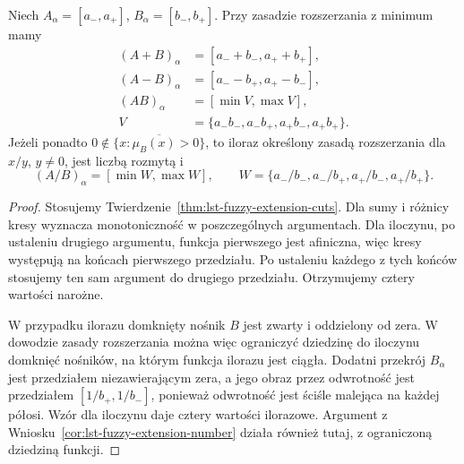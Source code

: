 \begin{stwierdzenie}\label{prop:lst-fuzzy-interval-arithmetic}
Niech $A_\alpha=[a_-,a_+]$, $B_\alpha=[b_-,b_+]$.
Przy zasadzie rozszerzania z minimum mamy
\[
\begin{split}
 (A+B)_\alpha&=[a_-+b_-,a_++b_+],\\
 (A-B)_\alpha&=[a_--b_+,a_+-b_-],\\
 (AB)_\alpha&=[\min V,\max V],\\
 V&=\{a_-b_-,a_-b_+,a_+b_-,a_+b_+\}.
\end{split}
\]
Jeżeli ponadto $0\notin\overline{\{x:\mu_B(x)>0\}}$,
to iloraz określony zasadą rozszerzania dla $x/y$,
$y\ne0$, jest liczbą rozmytą i
\[
 (A/B)_\alpha=[\min W,\max W],\qquad
 W=\{a_-/b_-,a_-/b_+,a_+/b_-,a_+/b_+\}.
\]
\end{stwierdzenie}
\begin{proof}
Stosujemy Twierdzenie~\ref{thm:lst-fuzzy-extension-cuts}.
Dla sumy i różnicy kresy wyznacza monotoniczność
w poszczególnych argumentach. Dla iloczynu, po ustaleniu
drugiego argumentu, funkcja pierwszego jest afiniczna,
więc kresy występują na końcach pierwszego przedziału.
Po ustaleniu każdego z tych końców stosujemy ten sam
argument do drugiego przedziału. Otrzymujemy cztery
wartości narożne.

W przypadku ilorazu domknięty nośnik $B$ jest zwarty
i oddzielony od zera. W dowodzie zasady rozszerzania
można więc ograniczyć dziedzinę do iloczynu domknięć
nośników, na którym funkcja ilorazu jest ciągła.
Dodatni przekrój $B_\alpha$ jest przedziałem
niezawierającym zera, a jego obraz przez odwrotność
jest przedziałem $[1/b_+,1/b_-]$, ponieważ odwrotność
jest ściśle malejąca na każdej półosi.
Wzór dla iloczynu daje cztery wartości ilorazowe.
Argument z Wniosku~\ref{cor:lst-fuzzy-extension-number}
działa również tutaj, z ograniczoną dziedziną funkcji.
\end{proof}


